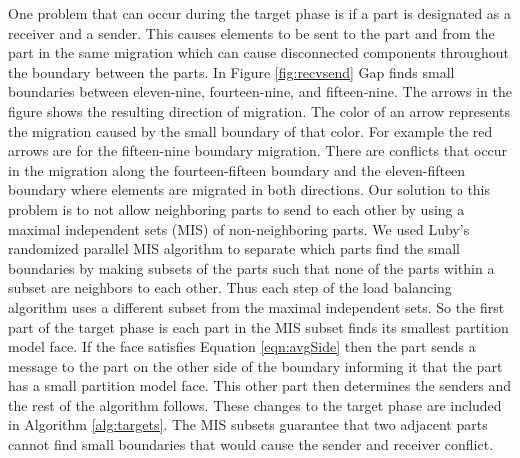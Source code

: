 \documentclass{thesis}
\begin{document}
One problem that can occur during the target phase is if a part is 
designated as a receiver and a sender. This causes elements to be sent 
to the part and from the part in the same migration which can cause 
disconnected components throughout the boundary between the parts. In Figure 
\ref{fig:recvsend} Gap finds small boundaries between  eleven-nine, 
fourteen-nine, and fifteen-nine.
The arrows in the figure shows the resulting direction of migration. The color 
of an arrow represents the migration caused by the small boundary of that color. 
For example the red arrows are for the fifteen-nine boundary migration. There 
are 
conflicts that occur in the migration along the fourteen-fifteen boundary and 
the eleven-fifteen 
boundary where elements are migrated in both directions.  Our solution to this 
problem is to not allow neighboring parts to send to each other by using a 
maximal independent sets (MIS) of non-neighboring parts. We used Luby's 
randomized parallel MIS algorithm \cite{luby} to separate which parts find the 
small boundaries by making subsets of the parts such that none of the parts 
within a subset are neighbors to each other. Thus each step of the load 
balancing algorithm uses a different subset from the maximal independent sets. 
So the first part of the target phase is each part in the MIS subset 
finds its smallest partition model face. If the face satisfies Equation \ref{eqn:avgSide} 
then the part sends a message to the part on the other side of the 
boundary informing it that the part has a small partition model face. This 
other part then 
determines the senders and the rest of the 
algorithm follows. These changes to the target phase are included in Algorithm 
\ref{alg:targets}. The MIS subsets guarantee that two adjacent parts cannot 
find small boundaries that would cause the sender and receiver conflict. 
\end{document}
